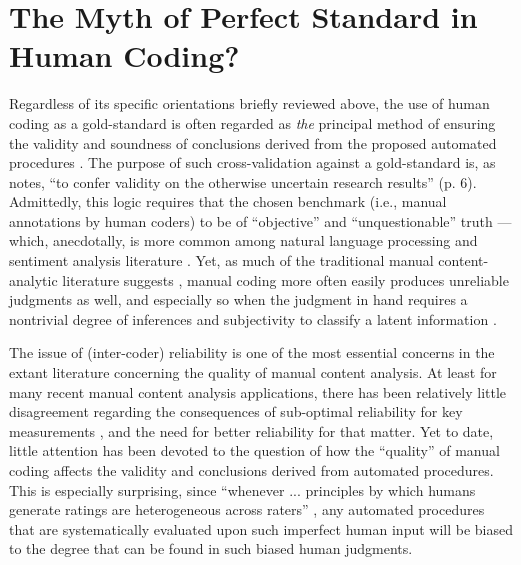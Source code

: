 \documentclass[man, 12pt, a4paper, nolmodern, noextraspace]{apa6}
\begin{document}
\section{The Myth of Perfect Standard in Human Coding?}

    Regardless of its specific orientations briefly reviewed above, the use of human coding as a gold-standard is often regarded as \textit{the} principal method of ensuring the validity and soundness of conclusions derived from the proposed automated procedures \parencites[e.g., ][]{grimmer2013text, dimaggio2015adapting}. The purpose of such cross-validation against a gold-standard is, as \textcite{Krippendorff2008validity} notes, \enquote{to confer validity on the otherwise uncertain research results} (p. 6). Admittedly, this logic requires that the chosen benchmark (i.e., manual annotations by human coders) to be of \enquote{objective} and \enquote{unquestionable} truth --- which, anecdotally, is more common among natural language processing and sentiment analysis literature \parencites[][]{dimaggio2015adapting}. Yet, as much of the traditional manual content-analytic literature suggests \parencites[e.g.,][]{krippendorff2004reliability, hayes2007answering, lombard2002content, ennser2018impact}, manual coding more often easily produces unreliable judgments as well, and especially so when the judgment in hand requires a nontrivial degree of inferences and subjectivity to classify a latent information \parencites[][]{riff2014analyzing, Krippendorff2013}.       
    
    The issue of (inter-coder) reliability is one of the most essential concerns in the extant literature concerning the quality of manual content analysis. At least for many recent manual content analysis applications, there has been relatively little disagreement regarding the consequences of sub-optimal reliability for key measurements \parencites[][]{krippendorff2004reliability, Krippendorff2013}, and the need for better reliability for that matter. Yet to date, little attention has been devoted to the question of how the \enquote{quality} of manual coding affects the validity and conclusions derived from automated procedures. This is especially surprising, since \enquote{whenever ... principles by which humans generate ratings are heterogeneous across raters} \parencites[][p. 4]{dimaggio2015adapting}, any automated procedures that are systematically evaluated upon such imperfect human input will be biased to the degree that can be found in such biased human judgments. 
    
\end{document}

